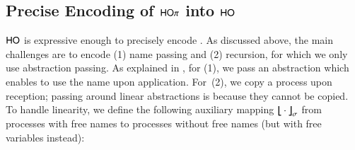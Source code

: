 \documentclass[preprint,11pt]{elsarticle}
\begin{document}
{{


\subsection{Precise Encoding of $\mathsf{HO}\pi$ into $\mathsf{HO}$}
\label{subsec:HOpi_to_HO}
$\mathsf{HO}$ is expressive enough to
precisely encode \HOp.
As discussed above, the main challenges are to encode (1) name passing 
and (2) recursion, 
for which 
we only use  abstraction passing. 
 As explained in , for (1), we pass  
an %
abstraction which enables to use the name upon application. 
For~(2), we 
copy a process upon reception; passing around linear abstractions
is  
because 
they cannot be copied.
To handle linearity, we define the following auxiliary 
 mapping 
$\big\lfloor\!\!\big\lfloor\cdot\big\rfloor\!\!\big\rfloor^{}_\sigma$
from processes with free names to processes without free
names (but with free variables instead):

}}
\end{document}

